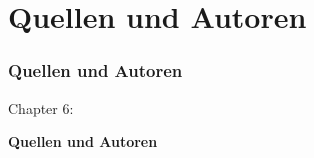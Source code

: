 %

\section{Quellen und Autoren}
\begin{frame}[fragile]
	\frametitle{Quellen und Autoren}

	\begin{center}\huge{Chapter 6:}\end{center}
	\begin{center}\huge{\color{typo3darkgrey}\textbf{Quellen und Autoren}}\end{center}

\end{frame}


